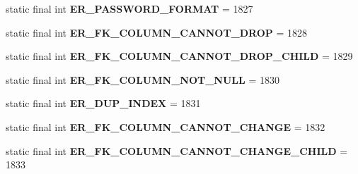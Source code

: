 \begin{DoxyCompactItemize}
\mbox{\label{classcom_1_1mysql_1_1jdbc_1_1_mysql_error_numbers_ac2b7b5bc67bedb77fc4ce11f31756a6c}} 
static final int {\bfseries E\+R\+\_\+\+P\+A\+S\+S\+W\+O\+R\+D\+\_\+\+F\+O\+R\+M\+AT} = 1827
\item 
\mbox{\label{classcom_1_1mysql_1_1jdbc_1_1_mysql_error_numbers_a4b107258556223783dd5facc66b9d6f6}} 
static final int {\bfseries E\+R\+\_\+\+F\+K\+\_\+\+C\+O\+L\+U\+M\+N\+\_\+\+C\+A\+N\+N\+O\+T\+\_\+\+D\+R\+OP} = 1828
\item 
\mbox{\label{classcom_1_1mysql_1_1jdbc_1_1_mysql_error_numbers_a3d34fa17a683698469568c2554349fb5}} 
static final int {\bfseries E\+R\+\_\+\+F\+K\+\_\+\+C\+O\+L\+U\+M\+N\+\_\+\+C\+A\+N\+N\+O\+T\+\_\+\+D\+R\+O\+P\+\_\+\+C\+H\+I\+LD} = 1829
\item 
\mbox{\label{classcom_1_1mysql_1_1jdbc_1_1_mysql_error_numbers_a851af987a6d8598ae55452e95aeae160}} 
static final int {\bfseries E\+R\+\_\+\+F\+K\+\_\+\+C\+O\+L\+U\+M\+N\+\_\+\+N\+O\+T\+\_\+\+N\+U\+LL} = 1830
\item 
\mbox{\label{classcom_1_1mysql_1_1jdbc_1_1_mysql_error_numbers_aa73fa13507f1daa97addb6c0881431e9}} 
static final int {\bfseries E\+R\+\_\+\+D\+U\+P\+\_\+\+I\+N\+D\+EX} = 1831
\item 
\mbox{\label{classcom_1_1mysql_1_1jdbc_1_1_mysql_error_numbers_a7339cca603b03a72573ad4f51a31300f}} 
static final int {\bfseries E\+R\+\_\+\+F\+K\+\_\+\+C\+O\+L\+U\+M\+N\+\_\+\+C\+A\+N\+N\+O\+T\+\_\+\+C\+H\+A\+N\+GE} = 1832
\item 
\mbox{\label{classcom_1_1mysql_1_1jdbc_1_1_mysql_error_numbers_ab3f01c3c74d56c36aeaf92094771ecce}} 
static final int {\bfseries E\+R\+\_\+\+F\+K\+\_\+\+C\+O\+L\+U\+M\+N\+\_\+\+C\+A\+N\+N\+O\+T\+\_\+\+C\+H\+A\+N\+G\+E\+\_\+\+C\+H\+I\+LD} = 1833
\item 
\mbox{\label{classcom_1_1mysql_1_1jdbc_1_1_mysql_error_numbers_afbdcf43bb3c62d253d12c527e8275064}} 

\end{DoxyCompactItemize}
